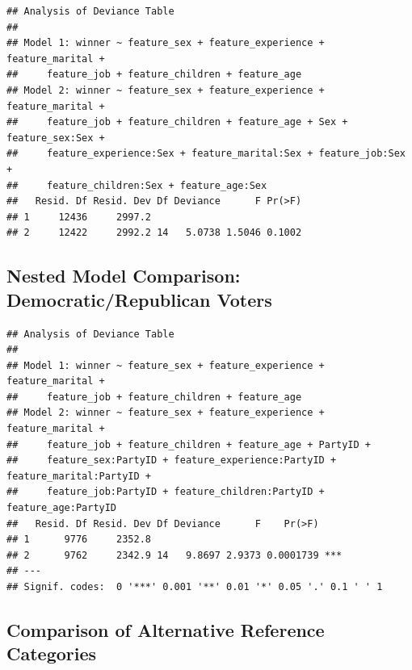 \documentclass[a4paper,12pt]{article}\usepackage[]{graphicx}\usepackage[]{color}
\makeatletter
\newenvironment{kframe}{%
 \def\at@end@of@kframe{}%
 \ifinner\ifhmode%
  \def\at@end@of@kframe{\end{minipage}}%
  \begin{minipage}{\columnwidth}%
 \fi\fi%
 \def\FrameCommand##1{\hskip\@totalleftmargin \hskip-\fboxsep
 \colorbox{shadecolor}{##1}\hskip-\fboxsep
     \hskip-\linewidth \hskip-\@totalleftmargin \hskip\columnwidth}%
 \MakeFramed {\advance\hsize-\width
   \@totalleftmargin\z@ \linewidth\hsize
   \@setminipage}}%
 {\par\unskip\endMakeFramed%
 \at@end@of@kframe}
\newenvironment{knitrout}{}{} %
\makeatother
\begin{document}
\begin{knitrout}
\color{fgcolor}\begin{kframe}
\begin{verbatim}
## Analysis of Deviance Table
## 
## Model 1: winner ~ feature_sex + feature_experience + feature_marital + 
##     feature_job + feature_children + feature_age
## Model 2: winner ~ feature_sex + feature_experience + feature_marital + 
##     feature_job + feature_children + feature_age + Sex + feature_sex:Sex + 
##     feature_experience:Sex + feature_marital:Sex + feature_job:Sex + 
##     feature_children:Sex + feature_age:Sex
##   Resid. Df Resid. Dev Df Deviance      F Pr(>F)
## 1     12436     2997.2                          
## 2     12422     2992.2 14   5.0738 1.5046 0.1002
\end{verbatim}
\end{kframe}
\end{knitrout}

\subsection{Nested Model Comparison: Democratic/Republican Voters}

\begin{knitrout}
\color{fgcolor}\begin{kframe}
\begin{verbatim}
## Analysis of Deviance Table
## 
## Model 1: winner ~ feature_sex + feature_experience + feature_marital + 
##     feature_job + feature_children + feature_age
## Model 2: winner ~ feature_sex + feature_experience + feature_marital + 
##     feature_job + feature_children + feature_age + PartyID + 
##     feature_sex:PartyID + feature_experience:PartyID + feature_marital:PartyID + 
##     feature_job:PartyID + feature_children:PartyID + feature_age:PartyID
##   Resid. Df Resid. Dev Df Deviance      F    Pr(>F)    
## 1      9776     2352.8                                 
## 2      9762     2342.9 14   9.8697 2.9373 0.0001739 ***
## ---
## Signif. codes:  0 '***' 0.001 '**' 0.01 '*' 0.05 '.' 0.1 ' ' 1
\end{verbatim}
\end{kframe}
\end{knitrout}


\clearpage


\subsection{Comparison of Alternative Reference Categories}
\end{document}
